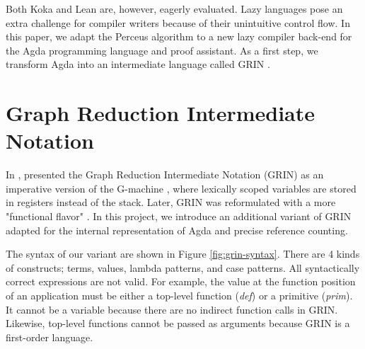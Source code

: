 \documentclass[10pt, twocolumn]{article}
\begin{document}
Both Koka and Lean are, however, eagerly evaluated. 
Lazy languages pose an extra challenge for compiler writers because of their unintuitive control flow. 
In this paper, we adapt the Perceus algorithm to a new lazy compiler back-end for the Agda programming language and proof assistant.
As a first step, we transform Agda into an intermediate language called GRIN \citep{johnsson1991}.

\section{Graph Reduction Intermediate Notation}
In \citeyear{johnsson1991}, \citeauthor{johnsson1991} presented the Graph Reduction Intermediate Notation (GRIN) as an imperative version of the G-machine \citep{johnsson1984}, where lexically scoped variables are stored in registers instead of the stack. 
Later, GRIN was reformulated with a more "functional flavor" \citep{boquist1995}.
In this project, we introduce an additional variant of GRIN adapted for the internal representation of Agda and precise reference counting. 

The syntax of our variant are shown in Figure \ref{fig:grin-syntax}.
There are 4 kinds of constructs; terms, values, lambda patterns, and case patterns.
All syntactically correct expressions are not valid. For example, the value at the function position of an application must be either a top-level function (\emph{def}) or a primitive (\emph{prim}). It cannot be a variable because
there are no indirect function calls in GRIN. Likewise, top-level functions cannot be passed 
as arguments because GRIN is a first-order language.
\end{document}

